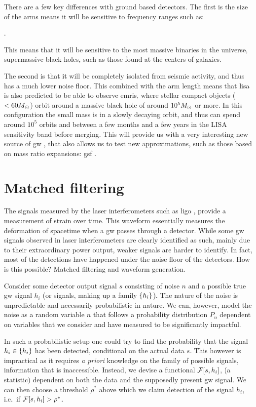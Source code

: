 \documentclass[
  11pt,
  a4paper,
  DIV=11,
  numbers=noendperiod,
  twoside]{scrreprt}
\let\[\relax \let\]\relax %
\DeclareRobustCommand{\[}{\begin{equation}}
\DeclareRobustCommand{\]}{\end{equation}}
\begin{document}
There are a few key differences with ground based detectors. The first
is the size of the arms means it will be sensitive to frequency ranges
such as:

\[
.
\]

This means that it will be sensitive to the most massive binaries in the
universe, supermassive black holes, such as those found at the centers
of galaxies.

The second is that it will be completely isolated from seismic activity,
and thus has a much lower noise floor. This combined with the arm length
means that \gls{lisa} is also predicted to be able to observe
\glspl{emri}, where stellar compact objects (\(<60 M_\odot\)) orbit
around a massive black hole of around \(10^5 M_\odot\) or more. In
this configuration the small mass is in a slowly decaying orbit, and
thus can spend around \(10^5\) orbits and between a few months and a few
years in the LISA sensitivity band before merging. This will provide us
with a very interesting new source of \gls{gw} , that also allows us to
test new approximations, such as those based on mass ratio expansions:
\gls{gsf} .

\hypertarget{matched-filtering}{%
\section{Matched filtering}\label{matched-filtering}}

The signals measured by the laser interferometers such as \gls{ligo} ,
provide a measurement of strain over time. This waveform essentially
measures the deformation of spacetime when a \gls{gw} passes through a
detector. While some \gls{gw} signals observed in laser interferometers
are clearly identified as such, mainly due to their extraordinary power
output, weaker signals are harder to identify. In fact, most of the
detections have happened under the noise floor of the detectors. How is
this possible? Matched filtering and waveform generation.

Consider some detector output signal \(s\) consisting of noise \(n\) and
a possible true \gls{gw} signal \(h_i\) (or signals, making up a family
\(\{h_i \}\)). The nature of the noise is unpredictable and necessarily
probabilistic in nature. We can, however, model the noise as a random
variable \(n\) that follows a probability distribution \(P_n\) dependent
on variables that we consider and have measured to be significantly
impactful.

In such a probabilistic setup one could try to find the probability that
the signal \(h_i\in \{h_i \}\) has been detected, conditional on the
actual data \(s\). This however is impractical as it requires \emph{a
priori} knowledge on the family of possible signals, information that is
inaccessible. Instead, we devise a functional
\(\mathcal{F}[s,h_i ]\), (a statistic) dependent on both the data and
the supposedly present \gls{gw} signal. We can then choose a threshold
\(\rho^*\) above which we claim detection of the signal \(h_i\), i.e.~if
\(\mathcal{F}[s,h_i ]>\rho^*\).
\end{document}
